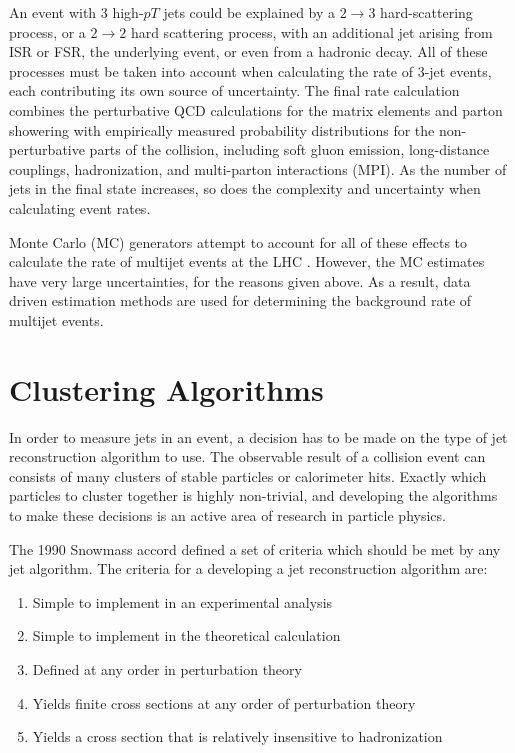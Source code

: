 An event with 3 high-$pT$ jets could be explained by a $2\rightarrow3$ hard-scattering process,
or a $2\rightarrow2$ hard scattering process, with an additional jet arising from ISR or FSR, the underlying event,
or even from a hadronic decay.
All of these processes must be taken into account when calculating the rate of 3-jet events,
each contributing its own source of uncertainty.
The final rate calculation combines the perturbative QCD calculations for the matrix elements and parton showering
with empirically measured probability distributions for the non-perturbative parts of the collision,
including soft gluon emission, long-distance couplings, hadronization, and multi-parton interactions (MPI). 
As the number of jets in the final state increases, so does the complexity and uncertainty when calculating event rates.

Monte Carlo (MC) generators attempt to account for all of these effects to calculate the rate of multijet events at the LHC .
However, the MC estimates have very large uncertainties, for the reasons given above.
As a result, data driven estimation methods are used for determining the background rate of multijet events.

\section{Clustering Algorithms}\label{sec:jet_clustering}

In order to measure jets in an event, a decision has to be made on the type of jet reconstruction algorithm to use.
The observable result of a collision event can consists of many clusters of stable particles or calorimeter hits.
Exactly which particles to cluster together is highly non-trivial, and developing the algorithms to make these decisions
is an active area of research in particle physics.

The 1990 Snowmass accord defined a set of criteria which should be met by any jet algorithm.
The criteria for a developing a jet reconstruction algorithm are:

\begin{enumerate}
    \item Simple to implement in an experimental analysis
    \item Simple to implement in the theoretical calculation
    \item Defined at any order in perturbation theory
    \item Yields finite cross sections at any order of perturbation theory
    \item Yields a cross section that is relatively insensitive to hadronization
\end{enumerate}\cite{jet-jetography,jet-snowmass}

